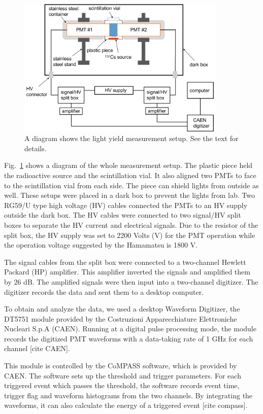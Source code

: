 \begin{figure}[htbp]
	\centering	
	\includegraphics[width=10cm]{teLSsetup.png}
	\caption{A diagram shows the light yield measurement setup. See the text for details.}
	\label{teLSsetup}
\end{figure}

Fig.~\ref{teLSsetup} shows a diagram of the whole measurement setup. The plastic piece held the radioactive source and the scintillation vial. It also aligned two PMTs to face to the scintillation vial from each side. The piece can shield lights from outside as well. These setups were placed in a dark box to prevent the lights from lab. Two RG59/U type high voltage (HV) cables connected the PMTs to an HV supply outside the dark box. The HV cables were connected to two signal/HV split boxes to separate the HV current and electrical signals. Due to the resistor of the split box, the HV supply was set to 2200 Volts (V) for the PMT operation while the operation voltage suggested by the Hamamatsu is 1800 V. 

The signal cables from the split box were connected to a two-channel Hewlett Packard (HP) amplifier. This amplifier inverted the signals and amplified them by 26 dB. The amplified signals were then input into a two-channel digitizer. The digitizer records the data and sent them to a desktop computer.

To obtain and analyze the data, we used a desktop Waveform Digitizer, the DT5751 module provided by the Costruzioni Apparecchiature Elettroniche Nucleari S.p.A (CAEN). Running at a digital pulse processing mode, the module records the digitized PMT waveforms with a data-taking rate of 1 GHz for each channel [cite CAEN].

This module is controlled by the CoMPASS software, which is provided by CAEN. The software sets up the threshold and trigger parameters. For each triggered event which passes the threshold, the software records event time, trigger flag and waveform histograms from the two channels. By integrating the waveforms, it can also calculate the energy of a triggered event [cite compass].

